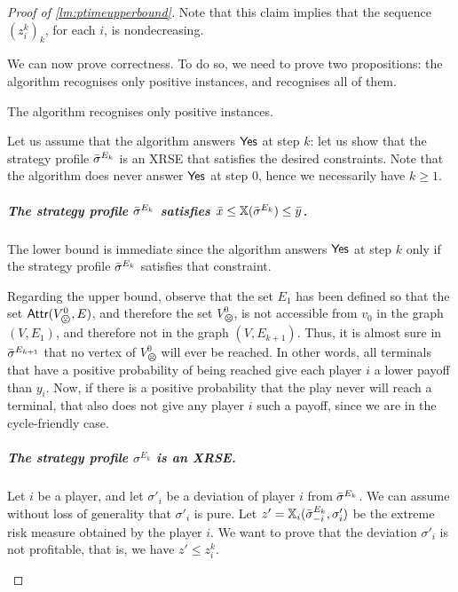 \begin{proof}[Proof of \cref{lm:ptimeupperbound}]
Note that this claim implies that the sequence $(z_i^k)_k$, for each $i$, is nondecreasing. 

 

We can now prove correctness.
To do so, we need to prove two propositions: the algorithm recognises only positive instances, and recognises all of them.

\begin{proposition}
    The algorithm recognises only positive instances.
\end{proposition}

 

\begin{claimproof}
        Let us assume that the algorithm answers $\mathsf{Yes}$ at step $k$: let us show that the strategy profile ${\bar{\sigma}}^{E_k}$ is an XRSE that satisfies the desired constraints.
        Note that the algorithm does never answer $\mathsf{Yes}$ at step $0$, hence we necessarily have $k \geq 1$.

        
        \subparagraph*{The strategy profile ${\bar{\sigma}}^{E_k}$ satisfies ${\bar{x}} \leq \mathbb{X}({{\bar{\sigma}}^{E_k} }) \leq {\bar{y}}$.}
        
        The lower bound is immediate since the algorithm answers $\mathsf{Yes}$ at step $k$ only if the strategy profile ${\bar{\sigma}}^{E_k}$ satisfies that constraint.

             
            
            Regarding the upper bound, observe that the set $E_1$ has been defined so that the set $\Attr(V_{\frownie}^0, E)$, and therefore the set $V_{\frownie}^0$, is not accessible from $v_0$ in the graph $(V, E_1)$, and therefore not in the graph $(V, E_{k+1})$.
            Thus, it is almost sure in ${\bar{\sigma}}^{E_{k+1}}$ that no vertex of $V_{\frownie}^0$ will ever be reached.
            In other words, all terminals that have a positive probability of being reached give each player $i$ a lower payoff than $y_i$.
            Now, if there is a positive probability that the play never will reach a terminal, that also does not give any player $i$ such a payoff, since we are in the cycle-friendly case.
             

        \subparagraph*{The strategy profile $\sigma^{E_k}$ is an XRSE.}
        
        Let $i$ be a player, and let $\sigma'_i$ be a deviation of player $i$ from ${\bar{\sigma}}^{E_k}$.
        We can assume without loss of generality that $\sigma'_i$ is pure.        
        Let $z' = \mathbb{X}_i({{\bar{\sigma}}^{E_k}_{-i}, \sigma'_i})$ be the extreme risk measure obtained by the player $i$.
        We want to prove that the deviation $\sigma'_i$ is not profitable, that is, we have $z' \leq z_i^k$.


\end{claimproof}
\end{proof}
